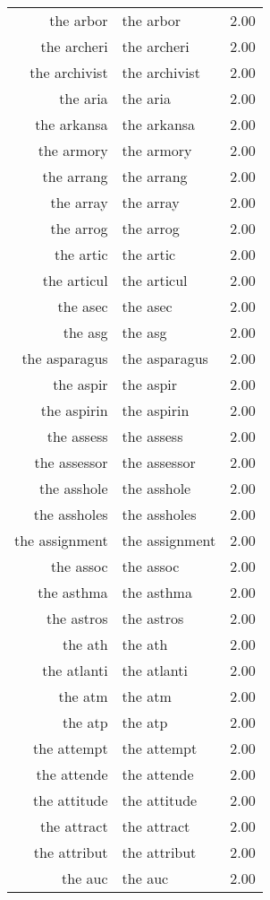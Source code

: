 \begin{table}[ht]
\begin{tabular}{rlr}
  the arbor & the arbor & 2.00 \\ 
  the archeri & the archeri & 2.00 \\ 
  the archivist & the archivist & 2.00 \\ 
  the aria & the aria & 2.00 \\ 
  the arkansa & the arkansa & 2.00 \\ 
  the armory & the armory & 2.00 \\ 
  the arrang & the arrang & 2.00 \\ 
  the array & the array & 2.00 \\ 
  the arrog & the arrog & 2.00 \\ 
  the artic & the artic & 2.00 \\ 
  the articul & the articul & 2.00 \\ 
  the asec & the asec & 2.00 \\ 
  the asg & the asg & 2.00 \\ 
  the asparagus & the asparagus & 2.00 \\ 
  the aspir & the aspir & 2.00 \\ 
  the aspirin & the aspirin & 2.00 \\ 
  the assess & the assess & 2.00 \\ 
  the assessor & the assessor & 2.00 \\ 
  the asshole & the asshole & 2.00 \\ 
  the assholes & the assholes & 2.00 \\ 
  the assignment & the assignment & 2.00 \\ 
  the assoc & the assoc & 2.00 \\ 
  the asthma & the asthma & 2.00 \\ 
  the astros & the astros & 2.00 \\ 
  the ath & the ath & 2.00 \\ 
  the atlanti & the atlanti & 2.00 \\ 
  the atm & the atm & 2.00 \\ 
  the atp & the atp & 2.00 \\ 
  the attempt & the attempt & 2.00 \\ 
  the attende & the attende & 2.00 \\ 
  the attitude & the attitude & 2.00 \\ 
  the attract & the attract & 2.00 \\ 
  the attribut & the attribut & 2.00 \\ 
  the auc & the auc & 2.00 \\ 

\end{tabular}
\end{table}
